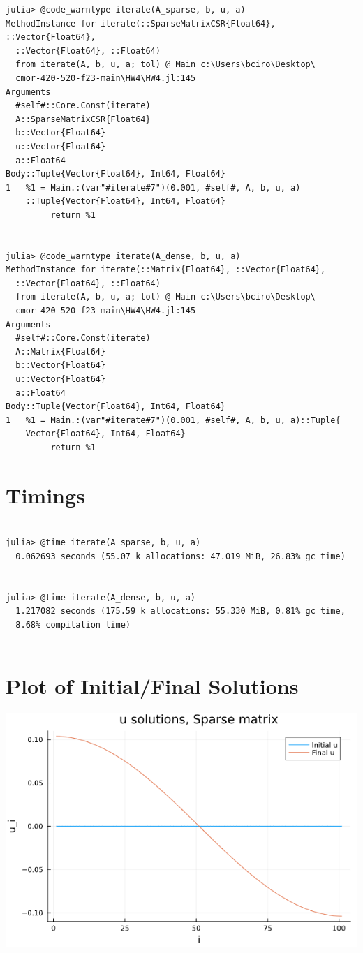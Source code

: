 \documentclass{article}
\begin{document}
\begin{verbatim}
julia> @code_warntype iterate(A_sparse, b, u, a)
MethodInstance for iterate(::SparseMatrixCSR{Float64}, ::Vector{Float64},
  ::Vector{Float64}, ::Float64)
  from iterate(A, b, u, a; tol) @ Main c:\Users\bciro\Desktop\
  cmor-420-520-f23-main\HW4\HW4.jl:145
Arguments
  #self#::Core.Const(iterate)
  A::SparseMatrixCSR{Float64}
  b::Vector{Float64}
  u::Vector{Float64}
  a::Float64
Body::Tuple{Vector{Float64}, Int64, Float64}
1   %1 = Main.:(var"#iterate#7")(0.001, #self#, A, b, u, a)
    ::Tuple{Vector{Float64}, Int64, Float64}
         return %1


julia> @code_warntype iterate(A_dense, b, u, a)
MethodInstance for iterate(::Matrix{Float64}, ::Vector{Float64},
  ::Vector{Float64}, ::Float64)
  from iterate(A, b, u, a; tol) @ Main c:\Users\bciro\Desktop\
  cmor-420-520-f23-main\HW4\HW4.jl:145
Arguments
  #self#::Core.Const(iterate)
  A::Matrix{Float64}
  b::Vector{Float64}
  u::Vector{Float64}
  a::Float64
Body::Tuple{Vector{Float64}, Int64, Float64}
1   %1 = Main.:(var"#iterate#7")(0.001, #self#, A, b, u, a)::Tuple{
    Vector{Float64}, Int64, Float64}
         return %1

\end{verbatim}

\section*{Timings}

\begin{verbatim}

julia> @time iterate(A_sparse, b, u, a)
  0.062693 seconds (55.07 k allocations: 47.019 MiB, 26.83% gc time)


julia> @time iterate(A_dense, b, u, a)
  1.217082 seconds (175.59 k allocations: 55.330 MiB, 0.81% gc time,
  8.68% compilation time)


\end{verbatim}

\section*{Plot of Initial/Final Solutions}

\includegraphics{SparseSolutions}
\end{document}
